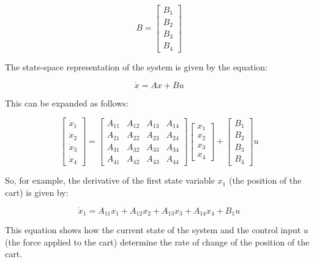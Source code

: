 \documentclass[11pt,twocolumn,twoside,lineno]{pnas-new}
\begin{document}
\begin{equation}
B = \begin{bmatrix}
B_{1} \\
B_{2} \\
B_{3} \\
B_{4}
\end{bmatrix}
\end{equation}

The state-space representation of the system is given by the equation:

\begin{equation}
\dot{x} = Ax + Bu
\end{equation}

This can be expanded as follows:

\begin{equation}
\begin{bmatrix}
\dot{x}_1 \\
\dot{x}_2 \\
\dot{x}_3 \\
\dot{x}_4
\end{bmatrix}
=
\begin{bmatrix}
A_{11} & A_{12} & A_{13} & A_{14} \\
A_{21} & A_{22} & A_{23} & A_{24} \\
A_{31} & A_{32} & A_{33} & A_{34} \\
A_{41} & A_{42} & A_{43} & A_{44}
\end{bmatrix}
\begin{bmatrix}
x_1 \\
x_2 \\
x_3 \\
x_4
\end{bmatrix}
+
\begin{bmatrix}
B_{1} \\
B_{2} \\
B_{3} \\
B_{4}
\end{bmatrix}
u
\end{equation}

So, for example, the derivative of the first state variable \(x_1\) (the position of the cart) is given by:

\begin{equation}
\dot{x}_1 = A_{11}x_1 + A_{12}x_2 + A_{13}x_3 + A_{14}x_4 + B_{1}u
\end{equation}

This equation shows how the current state of the system and the control input \(u\) (the force applied to the cart) determine the rate of change of the position of the cart.
\end{document}
